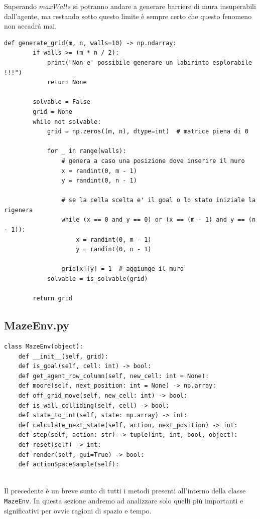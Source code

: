 Superando $maxWalls$ si potranno andare a generare barriere  di mura insuperabili dall'agente, ma restando sotto questo limite \`{e} sempre certo che questo fenomeno non accadr\`{a} mai.
\pagebreak
\begin{lstlisting}[style=python, caption={Funzione per la generazione di labirinti casuali}]
	def generate_grid(m, n, walls=10) -> np.ndarray:
		if walls >= (m * n / 2):
			print("Non e' possibile generare un labirinto esplorabile !!!")
			return None
	
		solvable = False
		grid = None
		while not solvable:
			grid = np.zeros((m, n), dtype=int)  # matrice piena di 0
	
			for _ in range(walls):
				# genera a caso una posizione dove inserire il muro
				x = randint(0, m - 1)
				y = randint(0, n - 1)
	
				# se la cella scelta e' il goal o lo stato iniziale la rigenera
				while (x == 0 and y == 0) or (x == (m - 1) and y == (n - 1)):
					x = randint(0, m - 1)
					y = randint(0, n - 1)
	
				grid[x][y] = 1  # aggiunge il muro
			solvable = is_solvable(grid)
	
		return grid
\end{lstlisting}

\subsection{MazeEnv.py}

\begin{lstlisting}[style=python, caption={Metodi di MazeEnv.py}]
class MazeEnv(object):
	def __init__(self, grid):
	def is_goal(self, cell: int) -> bool:
	def get_agent_row_column(self, new_cell: int = None):
	def moore(self, next_position: int = None) -> np.array:
	def off_grid_move(self, new_cell: int) -> bool:
	def is_wall_colliding(self, cell) -> bool:
	def state_to_int(self, state: np.array) -> int:
	def calculate_next_state(self, action, next_position) -> int:
	def step(self, action: str) -> tuple[int, int, bool, object]:
	def reset(self) -> int:
	def render(self, gui=True) -> bool:
	def actionSpaceSample(self):
	
\end{lstlisting}

Il precedente \`{e} un breve sunto di tutti i metodi presenti all'interno della classe \lstinline[style=cmd]|MazeEnv|. In questa sezione andremo ad analizzare solo quelli pi\`{u} importanti e significativi per ovvie ragioni di spazio e tempo.
\pagebreak
